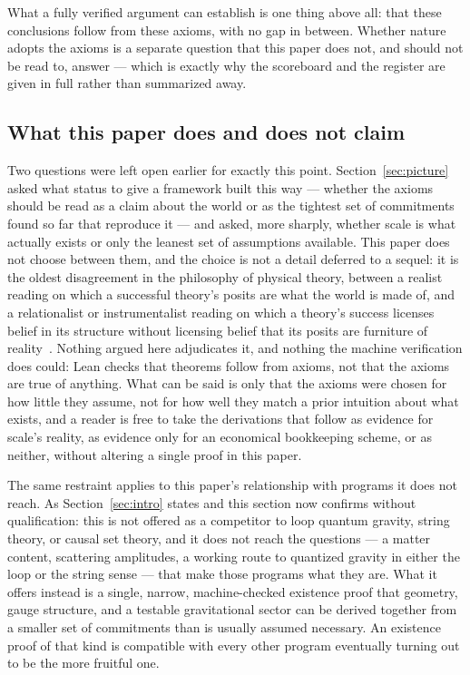 \documentclass[pdflatex,sn-mathphys-num]{sn-jnl}
\theoremstyle{thmstyleone}
\theoremstyle{thmstylethree}
\theoremstyle{thmstyletwo}
\begin{document}
What a fully verified argument can establish is one thing above all: that
these conclusions follow from these axioms, with no gap in between.
Whether nature adopts the axioms is a separate question that this paper
does not, and should not be read to, answer — which is exactly why the
scoreboard and the register are given in full rather than summarized
away.

\subsection{What this paper does and does not claim}

Two questions were left open earlier for exactly this point. Section~\ref{sec:picture}
asked what status to give a framework built this way — whether the
axioms should be read as a claim about the world or as the tightest set
of commitments found so far that reproduce it — and asked, more
sharply, whether scale is what actually exists or only the leanest set
of assumptions available. This paper does not choose between them, and
the choice is not a detail deferred to a sequel: it is the oldest
disagreement in the philosophy of physical theory, between a realist
reading on which a successful theory's posits are what the world is
made of, and a relationalist or instrumentalist reading on which a
theory's success licenses belief in its structure without licensing
belief that its posits are furniture of reality~\cite{Earman1989}.
Nothing argued here adjudicates it, and nothing the machine verification
does could: Lean checks that theorems follow from axioms, not that the
axioms are true of anything. What can be said is only that the axioms
were chosen for how little they assume, not for how well they match a
prior intuition about what exists, and a reader is free to take the
derivations that follow as evidence for scale's reality, as evidence
only for an economical bookkeeping scheme, or as neither, without
altering a single proof in this paper.

The same restraint applies to this paper's relationship with programs it
does not reach. As Section~\ref{sec:intro} states and this section now
confirms without qualification: this is not offered as a competitor to
loop quantum gravity, string theory, or causal set theory, and it does
not reach the questions — a matter content, scattering amplitudes, a
working route to quantized gravity in either the loop or the string
sense — that make those programs what they are. What it offers instead
is a single, narrow, machine-checked existence proof that geometry,
gauge structure, and a testable gravitational sector can be derived
together from a smaller set of commitments than is usually assumed
necessary. An existence proof of that kind is compatible with every
other program eventually turning out to be the more fruitful one.
\end{document}

